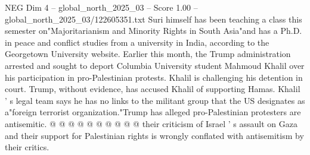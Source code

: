 \begin{textsample}{NEG Dim 4 – global\_north\_2025\_03 – Score 1.00 – global\_north\_2025\_03/122605351.txt}
Suri himself has been teaching a class this semester on"Majoritarianism and Minority Rights in South Asia"and has a Ph.D. in peace and conflict studies from a university in India, according to the Georgetown University website.
Earlier this month, the Trump administration arrested and sought to deport Columbia University student Mahmoud Khalil over his participation in pro-Palestinian protests.
Khalil is challenging his detention in court.
Trump, without evidence, has accused Khalil of supporting Hamas.
Khalil ' s legal team says he has no links to the militant group that the US designates as a"foreign terrorist organization."Trump has alleged pro-Palestinian protesters are antisemitic. @ @ @ @ @ @ @ @ @ @ their criticism of Israel ' s assault on Gaza and their support for Palestinian rights is wrongly conflated with antisemitism by their critics.

\end{textsample}
